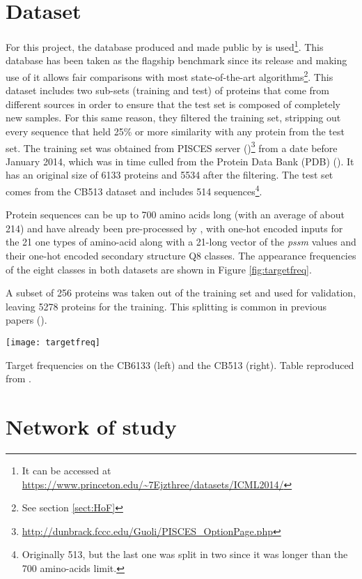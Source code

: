 \section{Dataset}
For this project, the database produced and made public by \cite{Zhou2014} is used\footnote{It can be accessed at \url{https://www.princeton.edu/\~7Ejzthree/datasets/ICML2014/}}. This database has been taken as the flagship benchmark since its release and making use of it allows fair comparisons with most state-of-the-art algorithms\footnote{See section \ref{sect:HoF}}. This dataset includes two sub-sets (training and test) of proteins that come from different sources in order to ensure that the test set is composed of completely new samples. For this same reason, they filtered the training set, stripping out every sequence that held 25\% or more similarity with any protein from the test set.
The training set was obtained from PISCES server (\cite{Wang2003})\footnote{\url{http://dunbrack.fccc.edu/Guoli/PISCES\_OptionPage.php}} from a date before January 2014, which was in time culled from the Protein Data Bank (PDB) (\cite{Berman2003}).
It has an original size of 6133 proteins and 5534 after the filtering. The test set comes from the CB513 dataset \cite{Cuff1999} and includes 514 sequences\footnote{Originally 513, but the last one was split in two since it was longer than the 700 amino-acids limit.}.

Protein sequences can be up to 700 amino acids long (with an average of about 214) and have already been pre-processed by \cite{Zhou2014}, with one-hot encoded inputs for the 21 one types of amino-acid along with a 21-long vector of the \textit{pssm} values and their one-hot encoded secondary structure Q8 classes. The appearance frequencies of the eight classes in both datasets are shown in Figure \ref{fig:targetfreq}.

A subset of 256 proteins was taken out of the training set and used for validation, leaving 5278 proteins for the training. This splitting is common in previous papers (\cite{Zhou2014,Sønderby2014,Busia2017,Jurtz2017,Hattori2017}).

\begin{table}[h]
	\centering
	\texttt{[image: targetfreq]}
	\caption{Target frequencies on the CB6133 (left) and the CB513 (right). Table reproduced from \cite{Hattori2017}.}
	\label{fig:targetfreq}
\end{table}


\section{Network of study}\label{sect:network}

